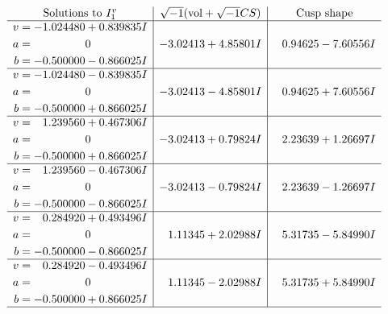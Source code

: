 \documentclass[1p]{elsarticle_modified}
\theoremstyle{definition}
\newcommand{\I}{\sqrt{-1}}
\begin{document}
$$\begin{array}{c|c|c}  
\text{Solutions to }I^v_{1}& \I (\text{vol} + \sqrt{-1}CS) & \text{Cusp shape}\\
 \hline 
\begin{aligned}
v &= -1.024480 + 0.839835 I \\
a &= \phantom{-0.000000 } 0 \\
b &= -0.500000 - 0.866025 I\end{aligned}
 & -3.02413 + 4.85801 I & \phantom{-}0.94625 - 7.60556 I \\ \hline\begin{aligned}
v &= -1.024480 - 0.839835 I \\
a &= \phantom{-0.000000 } 0 \\
b &= -0.500000 + 0.866025 I\end{aligned}
 & -3.02413 - 4.85801 I & \phantom{-}0.94625 + 7.60556 I \\ \hline\begin{aligned}
v &= \phantom{-}1.239560 + 0.467306 I \\
a &= \phantom{-0.000000 } 0 \\
b &= -0.500000 + 0.866025 I\end{aligned}
 & -3.02413 + 0.79824 I & \phantom{-}2.23639 + 1.26697 I \\ \hline\begin{aligned}
v &= \phantom{-}1.239560 - 0.467306 I \\
a &= \phantom{-0.000000 } 0 \\
b &= -0.500000 - 0.866025 I\end{aligned}
 & -3.02413 - 0.79824 I & \phantom{-}2.23639 - 1.26697 I \\ \hline\begin{aligned}
v &= \phantom{-}0.284920 + 0.493496 I \\
a &= \phantom{-0.000000 } 0 \\
b &= -0.500000 - 0.866025 I\end{aligned}
 & \phantom{-}1.11345 + 2.02988 I & \phantom{-}5.31735 - 5.84990 I \\ \hline\begin{aligned}
v &= \phantom{-}0.284920 - 0.493496 I \\
a &= \phantom{-0.000000 } 0 \\
b &= -0.500000 + 0.866025 I\end{aligned}
 & \phantom{-}1.11345 - 2.02988 I & \phantom{-}5.31735 + 5.84990 I\\
 \hline 
 \end{array}$$\newpage
\end{document}
